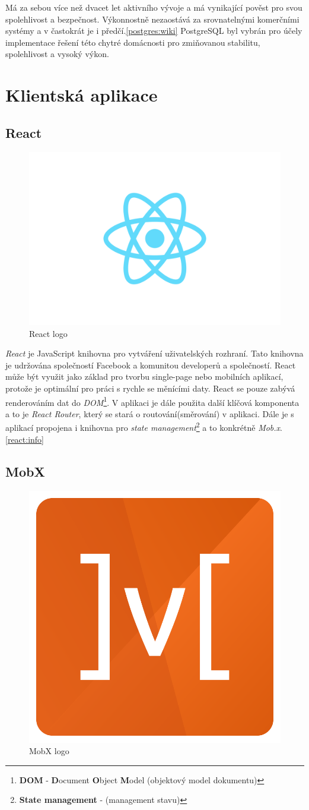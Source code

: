 Má za sebou více než dvacet let aktivního vývoje a má vynikající pověst pro svou spolehlivost a bezpečnost.
Výkonnostně nezaostává za srovnatelnými komerčními systémy a v častokrát je i předčí.\ref{postgres:wiki}
PostgreSQL byl vybrán pro účely implementace řešení této chytré domácnosti pro zmiňovanou stabilitu, spolehlivost a vysoký výkon.

\newpage
\section{Klientská aplikace}
\label{pouzite:frontend}

\subsection*{React}
\label{frontend:react}

\begin{figure}[hbt]
  \centering
  \includegraphics[width=.3 \linewidth]{obrazky-figures/react.png}
  \caption{React logo}
\end{figure}

\emph{React} je JavaScript knihovna pro vytváření uživatelských rozhraní.
Tato knihovna je udržována společností Facebook a komunitou developerů a společností.
React může být využit jako základ pro tvorbu single-page nebo mobilních aplikací, protože je optimální pro práci s rychle se měnícími daty.
React se pouze zabývá renderováním dat do \emph{DOM}\footnote{\textbf{DOM} - \textbf{D}ocument \textbf{O}bject \textbf{M}odel (objektový model dokumentu)}.
V aplikaci je dále použita další klíčová komponenta a to je \emph{React Router}, který se stará o routování(směrování) v aplikaci.
Dále je s aplikací propojena i knihovna pro \emph{state management}\footnote{\textbf{State management} - (management stavu)} a to konkrétně \emph{Mob.x}.\ref{react:info}

\subsection*{MobX}
\label{frontend:mobx}
\begin{figure}[hbt]
  \centering
  \includegraphics[width=.1 \linewidth]{obrazky-figures/mobx.png}
  \caption{MobX logo}
\end{figure}

